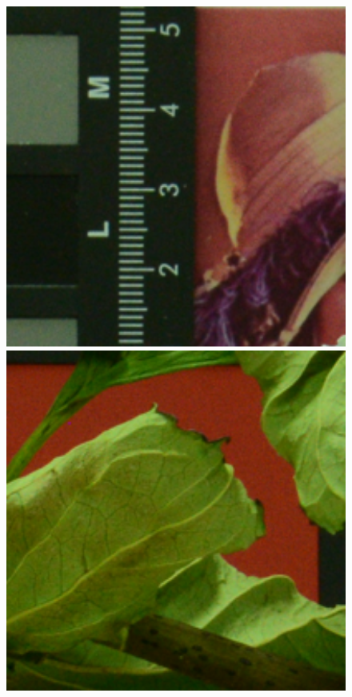 \documentclass[10pt,twocolumn,letterpaper,sort&compress]{article}
\begin{document}
\begin{figure}
{\begin{minipage}{0.085\textwidth}
\end{minipage}
\begin{minipage}{0.085\textwidth}
\includegraphics[width=1\textwidth]{CC15images/resize_d800_iso1600_2_real.png}
\end{minipage}
\begin{minipage}{0.085\textwidth}
\includegraphics[width=1\textwidth]{CC15images/resize_d800_iso1600_3_real.png}

\end{minipage}}
\end{figure}
\end{document}

